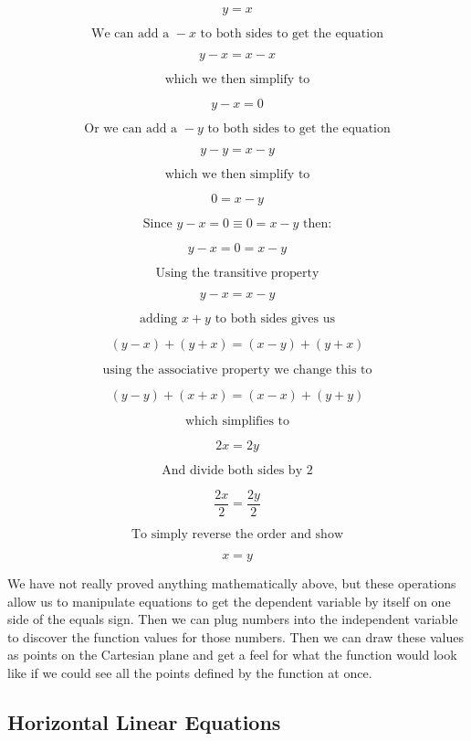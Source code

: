 \[
y = x
\]

\[
\text{We can add a } -x \text{ to both sides to get the equation}
\]

\[
y - x = x - x
\]

\[
\text{which we then simplify to}
\]

\[
y - x = 0
\]

\[
\text{Or we can add a } -y \text{ to both sides to get the equation}
\]

\[
y - y = x - y
\]

\[
\text{which we then simplify to}
\]

\[
0 = x - y
\]

\[
\text{Since } y - x = 0  \equiv 0 = x - y \text{ then:}
\]

\[
y - x = 0 = x - y
\]

\[
\text{Using the transitive property}
\]

\[
y - x  = x - y
\]

\[
\text{adding } x + y \text{ to both sides gives us}
\]

\[
(y - x )+( y + x)  = (x - y) + (y + x)
\]

\[
\text{using the associative property we change this to}
\]

\[
(y - y )+( x + x)  = (x - x) + (y + y)
\]

\[
\text{which simplifies to}
\]

\[
2x  = 2y
\]

\[
\text{And divide both sides by } 2
\]

\[
\frac{2x}{2}  = \frac{2y}{2}
\]

\[
\text{To simply reverse the order and show}
\]

\[
x = y
\]

We have not really proved anything mathematically above, but these operations allow us to
manipulate equations to get the dependent variable by itself on one side of the equals
sign. Then we can plug numbers into the independent variable to discover the function
values for those numbers. Then we can draw these values as points on the Cartesian plane
and get a feel for what the function would look like if we could see all the points
defined by the function at once.

\subsection{Horizontal Linear Equations}
\label{sss:hori-b67b}


